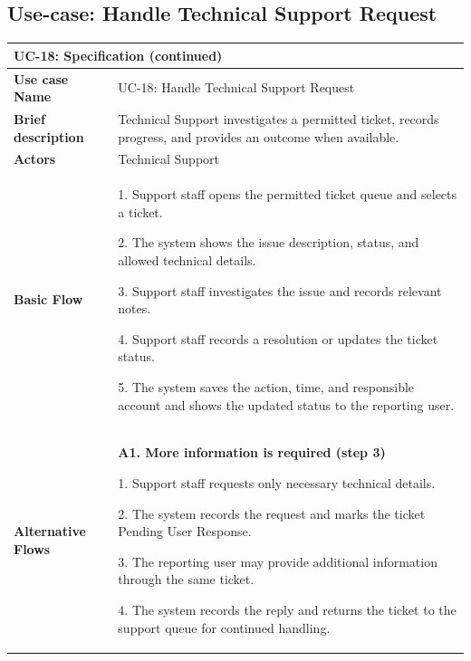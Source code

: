 \clearpage
\subsection{Use-case: Handle Technical Support Request}
\label{uc:uc-18}

\begin{longtable}{|p{}|p{}|}
\hline
\endfirsthead
\multicolumn{2}{l}{\textbf{UC-18: Specification (continued)}} \\
\hline
\endhead
\textbf{Use case Name} & UC-18: Handle Technical Support Request \\ \hline
\textbf{Brief description} & Technical Support investigates a permitted ticket, records progress, and provides an outcome when available. \\ \hline
\textbf{Actors} & Technical Support \\ \hline
\textbf{Basic Flow} &
1. Support staff opens the permitted ticket queue and selects a ticket.\par
2. The system shows the issue description, status, and allowed technical details.\par
3. Support staff investigates the issue and records relevant notes.\par
4. Support staff records a resolution or updates the ticket status.\par
5. The system saves the action, time, and responsible account and shows the updated status to the reporting user.
\\ \hline
\textbf{Alternative Flows} &

\textbf{A1. More information is required (step 3)}\par
1. Support staff requests only necessary
technical details.\par
2. The system records the request and marks
the ticket Pending User Response.\par
3. The reporting user may provide additional
information through the same ticket.\par
4. The system records the reply and returns
the ticket to the support queue for continued handling.


\end{longtable}
